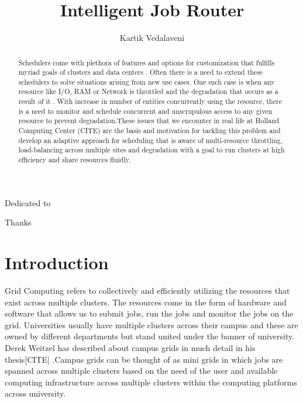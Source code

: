 \documentclass[ms,electronic,double]{nuthesis}
\begin{document}
\frontmatter
\title{Intelligent Job Router}
\author{Kartik Vedalaveni}
\maketitle

\begin{abstract}
Schedulers come with plethora of features and 
options for customization that fulfills myriad goals of  
clusters and data centers . Often there is a need to extend these schedulers to solve 
situations arising from new use cases. One such case is when any resource like I/O, RAM or Network is
throttled and the degradation that occurs as a result of it . With increase in number of entities concurrently 
using the resource, there is a 
need to monitor and schedule concurrent and unscrupulous access to any given resource to prevent 
degradation.These issues that we encounter in real life at Holland Computing Center (CITE) are the 
basis and motivation for tackling this problem and develop an adaptive approach for scheduling 
that is aware of multi-resource throttling, load-balancing across multiple sites and degradation 
with a goal to run clusters at high efficiency and share resources fluidly. 
\end{abstract}

\begin{dedication}
Dedicated to 
\end{dedication}

\begin{acknowledgments}
Thanks
\end{acknowledgments}

\tableofcontents


\mainmatter

\chapter{Introduction}
Grid Computing refers to collectively and efficiently utilizing the resources 
that exist across multiple clusters. The resources come in the form of hardware 
and software that allows us to submit jobs, run the jobs and monitor the jobs on the grid. 
Universities usually have multiple clusters across their campus and these are 
owned by different departments but stand united under the banner of university. 
Derek Weitzel has described about campus grids in much detail in his thesis[CITE] 
.Campus grids can be thought of as mini grids in which jobs are spanned across multiple clusters
 based on the need of the user and available computing infrastructure 
across multiple clusters within the computing platforms across university.
\end{document}
